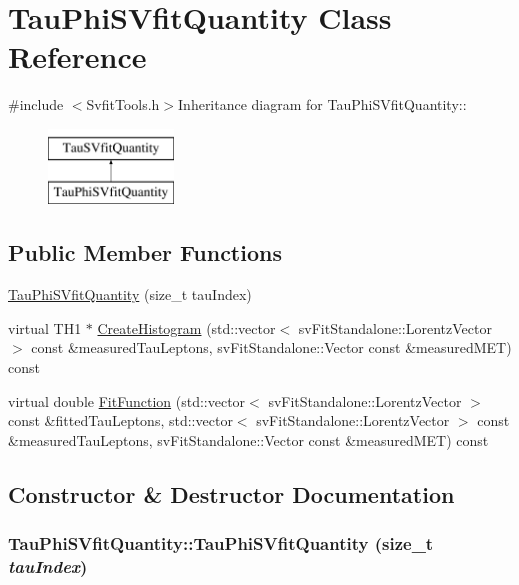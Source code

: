 \hypertarget{classTauPhiSVfitQuantity}{
\section{TauPhiSVfitQuantity Class Reference}
\label{classTauPhiSVfitQuantity}
}


{\ttfamily \#include $<$SvfitTools.h$>$}Inheritance diagram for TauPhiSVfitQuantity::\begin{figure}[H]
\begin{center}
\leavevmode
\includegraphics[height=2cm]{classTauPhiSVfitQuantity}
\end{center}
\end{figure}
\subsection*{Public Member Functions}
\begin{DoxyCompactItemize}
\item 
\hyperlink{classTauPhiSVfitQuantity_aedd1a84f7e42143729750245897dde51}{TauPhiSVfitQuantity} (size\_\-t tauIndex)
\item 
virtual TH1 $\ast$ \hyperlink{classTauPhiSVfitQuantity_ad342382d29321a9663070ec110c0a2e9}{CreateHistogram} (std::vector$<$ svFitStandalone::LorentzVector $>$ const \&measuredTauLeptons, svFitStandalone::Vector const \&measuredMET) const 
\item 
virtual double \hyperlink{classTauPhiSVfitQuantity_ae5319b4e4398ea95ff0ea723c70ce914}{FitFunction} (std::vector$<$ svFitStandalone::LorentzVector $>$ const \&fittedTauLeptons, std::vector$<$ svFitStandalone::LorentzVector $>$ const \&measuredTauLeptons, svFitStandalone::Vector const \&measuredMET) const 
\end{DoxyCompactItemize}


\subsection{Constructor \& Destructor Documentation}
\hypertarget{classTauPhiSVfitQuantity_aedd1a84f7e42143729750245897dde51}{
\subsubsection[{TauPhiSVfitQuantity}]{\setlength{\rightskip}{0pt plus 5cm}TauPhiSVfitQuantity::TauPhiSVfitQuantity (size\_\-t {\em tauIndex})}}
\label{classTauPhiSVfitQuantity_aedd1a84f7e42143729750245897dde51}


